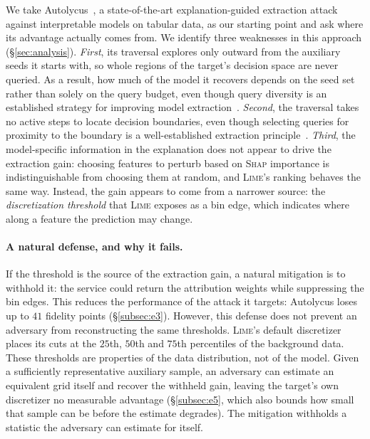 \documentclass[sigconf,anonymous,review]{acmart}
\begin{document}
We take Autolycus~\cite{oksuz2024autolycus}, a state-of-the-art explanation-guided extraction attack against interpretable models on tabular data, as our starting point and ask where its advantage actually comes from. We identify three weaknesses in this approach (\S\ref{sec:analysis}).
\emph{First}, its traversal explores only outward from the auxiliary seeds it starts with, so whole
regions of the target's decision space are never queried. As a result, how much of the model it recovers depends on the seed set rather than solely on the query budget, even though query diversity is an established strategy for improving model extraction~\cite{pal2020activethief}. \emph{Second}, the traversal takes no active
steps to locate decision boundaries, even though selecting queries for proximity to the boundary is a
well-established extraction principle~\cite{tramer2016stealing,pal2020activethief}. \emph{Third}, the model-specific information in the explanation does not appear to drive the extraction gain: choosing features to
perturb based on \textsc{Shap} importance is indistinguishable from choosing them at random, and
\textsc{Lime}'s ranking behaves the same way. Instead, the gain appears to come from a narrower source: the \emph{discretization threshold} that \textsc{Lime} exposes as a bin edge, which indicates where along a feature the prediction may change.

\paragraph{A natural defense, and why it fails.} If the threshold is the source of the extraction gain, a natural mitigation is to withhold it: the service could return the attribution weights while suppressing the bin edges. This reduces the performance of the attack it targets: Autolycus loses up to $41$ fidelity points
(\S\ref{subsec:e3}). However, this defense does not prevent an adversary from reconstructing the same thresholds. \textsc{Lime}'s default discretizer places its cuts at the $25$th, $50$th and $75$th
percentiles of the background data. These thresholds are properties of the data distribution, not of the model. Given a sufficiently representative auxiliary sample, an adversary can estimate an equivalent grid itself and
recover the withheld gain, leaving the target's own discretizer no measurable advantage
(\S\ref{subsec:e5}, which also bounds how small that sample can be before the estimate degrades). The mitigation withholds a statistic the adversary can
estimate for itself.
\end{document}
